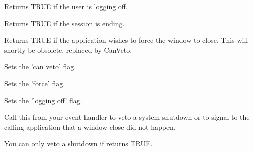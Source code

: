 
Returns TRUE if the user is logging off.

\label{wxcloseeventgetsessionending}


Returns TRUE if the session is ending.

\label{wxcloseeventgetforce}


Returns TRUE if the application wishes to force the window to close.
This will shortly be obsolete, replaced by CanVeto.

\label{wxcloseeventsetcanveto}


Sets the 'can veto' flag.

\label{wxcloseeventsetforce}


Sets the 'force' flag.

\label{wxcloseeventsetloggingoff}


Sets the 'logging off' flag.

\label{wxcloseeventveto}


Call this from your event handler to veto a system shutdown or to signal
to the calling application that a window close did not happen.

You can only veto a shutdown if  returns
TRUE.


